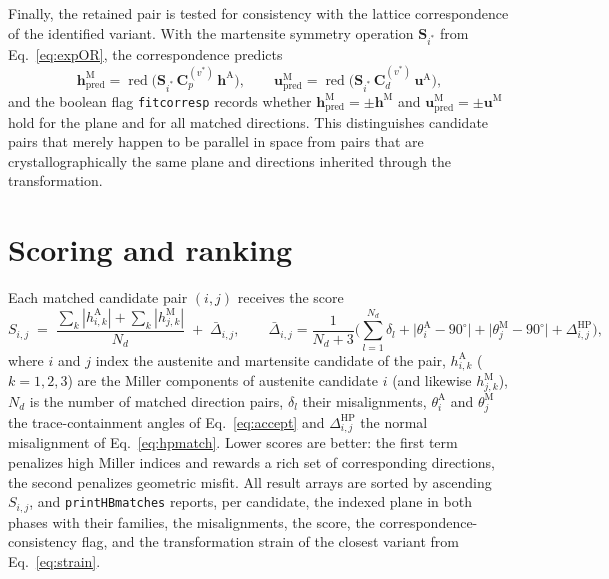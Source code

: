 \documentclass[11pt,a4paper]{article}
\newcommand{\mat}[1]{\mathbf{#1}}
\newcommand{\vc}[1]{\bm{#1}}
\begin{document}
Finally, the retained pair is tested for consistency with the lattice correspondence of the identified variant. With the martensite symmetry operation $\mat S_{i^\ast}$ from Eq.~\eqref{eq:expOR}, the correspondence predicts
\begin{equation}
\vc h^{\mathrm M}_{\mathrm{pred}}=\operatorname{red}\big(\mat S_{i^\ast}\,\mat C_p^{(v^\ast)}\,\vc h^{\mathrm A}\big),
\qquad
\vc u^{\mathrm M}_{\mathrm{pred}}=\operatorname{red}\big(\mat S_{i^\ast}\,\mat C_d^{(v^\ast)}\,\vc u^{\mathrm A}\big),
\label{eq:corresp}
\end{equation}
and the boolean flag \texttt{fitcorresp} records whether $\vc h^{\mathrm M}_{\mathrm{pred}}=\pm\vc h^{\mathrm M}$ and $\vc u^{\mathrm M}_{\mathrm{pred}}=\pm\vc u^{\mathrm M}$ hold for the plane and for all matched directions. This distinguishes candidate pairs that merely happen to be parallel in space from pairs that are crystallographically the same plane and directions inherited through the transformation.

\section{Scoring and ranking}

Each matched candidate pair $(i,j)$ receives the score
\begin{equation}
S_{i,j} \;=\; \frac{\sum_k |h^{\mathrm A}_{i,k}| + \sum_k |h^{\mathrm M}_{j,k}|}{N_d}
\;+\;
\bar\Delta_{i,j},
\qquad
\bar\Delta_{i,j}=\frac{1}{N_d+3}\Big(\sum_{l=1}^{N_d}\delta_l
+\big|\theta^{\mathrm A}_i-90^\circ\big|
+\big|\theta^{\mathrm M}_j-90^\circ\big|
+\Delta^{\mathrm{HP}}_{i,j}\Big),
\label{eq:score}
\end{equation}
where $i$ and $j$ index the austenite and martensite candidate of the pair, $h^{\mathrm A}_{i,k}$ ($k=1,2,3$) are the Miller components of austenite candidate $i$ (and likewise $h^{\mathrm M}_{j,k}$), $N_d$ is the number of matched direction pairs, $\delta_l$ their misalignments, $\theta^{\mathrm A}_i$ and $\theta^{\mathrm M}_j$ the trace-containment angles of Eq.~\eqref{eq:accept} and $\Delta^{\mathrm{HP}}_{i,j}$ the normal misalignment of Eq.~\eqref{eq:hpmatch}. Lower scores are better: the first term penalizes high Miller indices and rewards a rich set of corresponding directions, the second penalizes geometric misfit. All result arrays are sorted by ascending $S_{i,j}$, and \texttt{printHBmatches} reports, per candidate, the indexed plane in both phases with their families, the misalignments, the score, the correspondence-consistency flag, and the transformation strain of the closest variant from Eq.~\eqref{eq:strain}.
\end{document}
